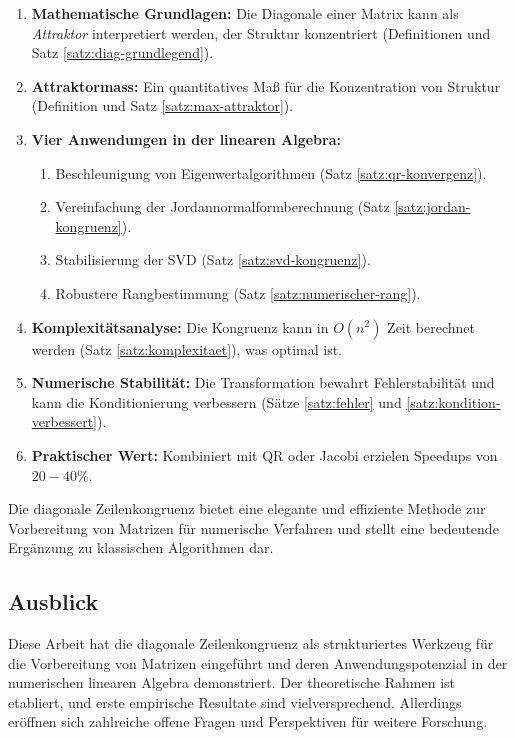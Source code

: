 \documentclass[a4paper,12pt]{article}
\theoremstyle{definition}
\begin{document}
\begin{enumerate}
	\item \textbf{Mathematische Grundlagen:} Die Diagonale einer Matrix kann als \emph{Attraktor} interpretiert werden, der Struktur konzentriert (Definitionen und Satz \ref{satz:diag-grundlegend}).
	\item \textbf{Attraktormass:} Ein quantitatives Maß für die Konzentration von Struktur (Definition und Satz \ref{satz:max-attraktor}).
	\item \textbf{Vier Anwendungen in der linearen Algebra:}
	\begin{enumerate}
		\item Beschleunigung von Eigenwertalgorithmen (Satz \ref{satz:qr-konvergenz}).
		\item Vereinfachung der Jordannormalformberechnung (Satz \ref{satz:jordan-kongruenz}).
		\item Stabilisierung der SVD (Satz \ref{satz:svd-kongruenz}).
		\item Robustere Rangbestimmung (Satz \ref{satz:numerischer-rang}).
	\end{enumerate}
	\item \textbf{Komplexitätsanalyse:} Die Kongruenz kann in $O(n^2)$ Zeit berechnet werden (Satz \ref{satz:komplexitaet}), was optimal ist.
	\item \textbf{Numerische Stabilität:} Die Transformation bewahrt Fehlerstabilität und kann die Konditionierung verbessern (Sätze \ref{satz:fehler} und \ref{satz:kondition-verbessert}).
	\item \textbf{Praktischer Wert:} Kombiniert mit QR oder Jacobi erzielen Speedups von $20-40\%$.
\end{enumerate}

Die diagonale Zeilenkongruenz bietet eine elegante und effiziente Methode zur Vorbereitung von Matrizen für numerische Verfahren und stellt eine bedeutende Ergänzung zu klassischen Algorithmen dar.

\subsection{Ausblick}

Diese Arbeit hat die diagonale Zeilenkongruenz als strukturiertes Werkzeug für die Vorbereitung von Matrizen eingeführt und deren Anwendungspotenzial in der numerischen linearen Algebra demonstriert. Der theoretische Rahmen ist etabliert, und erste empirische Resultate sind vielversprechend. Allerdings eröffnen sich zahlreiche offene Fragen und Perspektiven für weitere Forschung.
\end{document}
